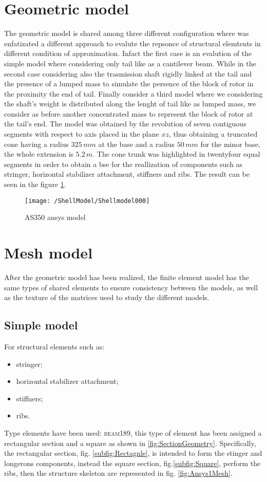 \section{Geometric model}
The geometric model is shared among three different configuration where was enfatizated a different approach to evalute the repsonce of structural elemtents in different condition of approximation. Infact the first case is an evalution of the simple model where considering only tail like as a cantilever beam. 
While in the second case considering also the trasmission shaft rigidly linked at the tail and the presence of a lumped mass to simulate the persence of the block of rotor in the proximity the end of tail. 
Finally consider a third model where we considering the shaft's weight is distributed along the lenght of tail like as lumped mass, we consider as before another concentrated mass to represent the block of rotor at the tail's end.
The model was obtained by the revolution of seven contiguous segments with respect to axis placed in the plane $xz$, thus obtaining a truncated cone having a radius $325\,mm$ at the base and a radius $50\,mm$ for the minor base, the whole extension is $5.2\,m$.
The cone trunk was highlighted in twentyfour equal segments in order to obtain a bse for the reallization of components such as stringer, horizontal stabilizer attachment, stiffners and ribs.
The result can be seen in the figure \ref{fig:Ansys1}.

\begin{figure}[htb]
\centering
\texttt{[image: /ShellModel/Shellmodel000]}
\caption{AS350 ansys model}
\label{fig:Ansys1}
\end{figure}

\section{Mesh model}
After the geometric model has been realized, the finite element model has the same types of shared elements to ensure consistency between the models, as well as the texture of the matrices used to study the different models.
\subsection{Simple model}
For structural elements such as:
\begin{itemize}
\item stringer;
\item horizontal stabilizer attachment;
\item stiffners;
\item ribs.
\end{itemize}
Type elements have been used: \textsc{beam189}, this type of element has been assigned a rectangular section and a square as shown in \ref{fig:SectionGeometry}. Specifically, the rectangular section, fig. \ref{subfig:Rectagnle}, is intended to form the stinger and longerons components, instead the square section, fig.\ref{subfig:Square}, perform the ribs, then the structure skeleton are represented in fig. \ref{fig:Ansys1Mesh}.

